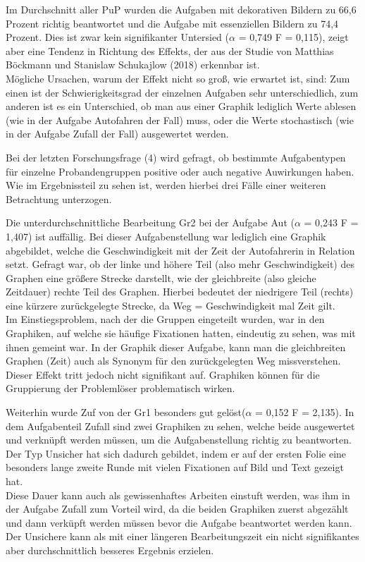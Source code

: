 Im Durchschnitt aller \gls{PuP} wurden die Aufgaben mit dekorativen Bildern zu 66,6 Prozent richtig beantwortet und die Aufgabe mit essenziellen Bildern zu 74,4 Prozent. Dies ist zwar kein signifikanter Untersied ($\alpha$ = 0,749 F = 0,115), zeigt aber eine Tendenz in Richtung des Effekts, der aus der Studie von Matthias Böckmann und Stanislaw Schukajlow (2018) erkennbar ist. \\Mögliche Ursachen, warum der Effekt nicht so groß, wie erwartet ist, sind: Zum einen ist der Schwierigkeitsgrad der einzelnen Aufgaben sehr unterschiedlich, zum anderen ist es ein Unterschied, ob man aus einer Graphik lediglich Werte ablesen (wie in der Aufgabe Autofahren der Fall) muss, oder die Werte stochastisch (wie in der Aufgabe Zufall der Fall) ausgewertet werden.


Bei der letzten Forschungsfrage (4) wird gefragt, ob bestimmte Aufgabentypen für einzelne Probandengruppen positive oder auch negative Auwirkungen haben. Wie im Ergebnissteil zu sehen ist, werden hierbei drei Fälle einer weiteren Betrachtung unterzogen. 


Die unterdurchschnittliche Bearbeitung \gls{Gr2} bei der Aufgabe \gls{Aut} ($\alpha$ = 0,243 F = 1,407) ist auffällig. Bei dieser Aufgabenstellung war lediglich eine Graphik abgebildet, welche die Geschwindigkeit mit der Zeit der Autofahrerin in Relation setzt. Gefragt war, ob der linke und höhere Teil (also mehr Geschwindigkeit)  des Graphen eine größere Strecke darstellt, wie der gleichbreite (also gleiche Zeitdauer) rechte Teil des Graphen.  Hierbei bedeutet der niedrigere Teil (rechts) eine kürzere zurückgelegte Strecke, da  Weg = Geschwindigkeit mal Zeit gilt. \\
Im Einstiegsproblem, nach der die Gruppen eingeteilt wurden, war in den Graphiken, auf welche sie häufige Fixationen hatten, eindeutig zu sehen, was mit ihnen gemeint war. In der Graphik dieser Aufgabe, kann man die gleichbreiten Graphen (Zeit) auch als Synonym für den zurückgelegten Weg missverstehen. Dieser Effekt tritt jedoch nicht signifikant auf. Graphiken können für die Gruppierung der Problemlöser problematisch wirken.


Weiterhin wurde \gls{Zuf} von der \gls{Gr1} besonders gut gelöst($\alpha$ = 0,152 F = 2,135). In dem Aufgabenteil Zufall sind zwei Graphiken zu sehen, welche beide ausgewertet und verknüpft werden müssen, um die Aufgabenstellung richtig zu beantworten. Der Typ Unsicher hat sich dadurch gebildet, indem er auf der ersten Folie eine besonders lange zweite Runde mit vielen Fixationen auf Bild und Text gezeigt hat. \\
Diese Dauer kann auch als gewissenhaftes Arbeiten einstuft werden, was ihm in der Aufgabe Zufall zum Vorteil wird, da die beiden Graphiken zuerst abgezählt und dann verküpft werden müssen bevor die Aufgabe beantwortet werden kann. Der Unsichere kann als mit einer längeren Bearbeitungszeit ein nicht signifikantes aber durchschnittlich besseres Ergebnis erzielen. 


